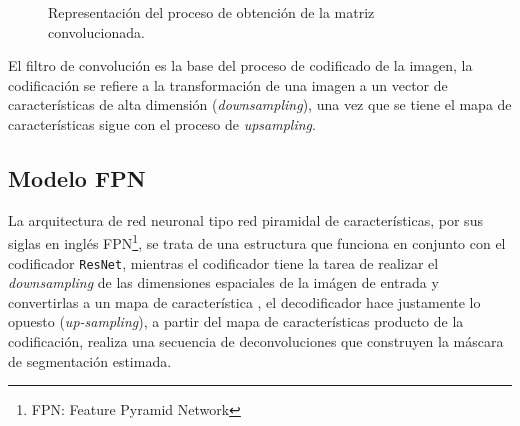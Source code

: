 \begin{figure}[b]
    \centering
    \caption{Representación del proceso de obtención de la matriz convolucionada.}
\end{figure}

El filtro de convolución es la base del proceso de codificado de la imagen, la codificación se refiere a la transformación de una imagen a un vector de características de alta dimensión (\emph{downsampling}), una vez que se tiene el mapa de características sigue con el proceso de \emph{upsampling}.

\subsection{Modelo FPN}
La arquitectura de red neuronal tipo red piramidal de características, por sus siglas en inglés FPN\footnote{FPN: Feature Pyramid Network}, se trata de una estructura que funciona en conjunto con el codificador \texttt{ResNet}, mientras el codificador tiene la tarea de realizar el \emph{downsampling} de las dimensiones espaciales de la imágen de entrada y convertirlas a un mapa de característica , el decodificador hace justamente lo opuesto (\emph{up-sampling}), a partir del mapa de características producto de la codificación, realiza una secuencia de deconvoluciones que construyen la máscara de segmentación estimada.

